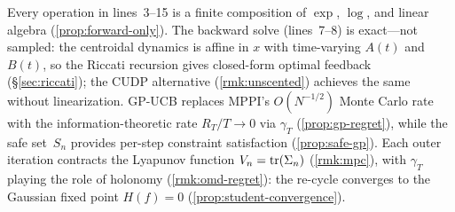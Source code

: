 \begin{remark}
\label{rem:arithmetic-complete}
Every operation in lines~3--15 is a finite composition of
$\exp$, $\log$, and linear algebra
(\cref{prop:forward-only}).
The backward solve (lines~7--8) is exact---not sampled: the
centroidal dynamics is affine in $x$ with time-varying $A(t)$
and $B(t)$, so the Riccati recursion gives closed-form optimal
feedback (\S\ref{sec:riccati}); the CUDP alternative
(\cref{rmk:unscented}) achieves the same without linearization.
GP-UCB replaces MPPI's $O(N^{-1/2})$ Monte Carlo rate with
the information-theoretic rate $R_T/T \to 0$ via
$\gamma_T$ (\cref{prop:gp-regret}), while the safe set~$S_n$
provides per-step constraint satisfaction
(\cref{prop:safe-gp}).
Each outer iteration contracts the Lyapunov function
$V_n = \operatorname{tr}(\Sigma_n)$ (\cref{rmk:mpc}), with
$\gamma_T$ playing the role of holonomy
(\cref{rmk:omd-regret}): the re-cycle converges to the
Gaussian fixed point $H(f) = 0$
(\cref{prop:student-convergence}).
\end{remark}

